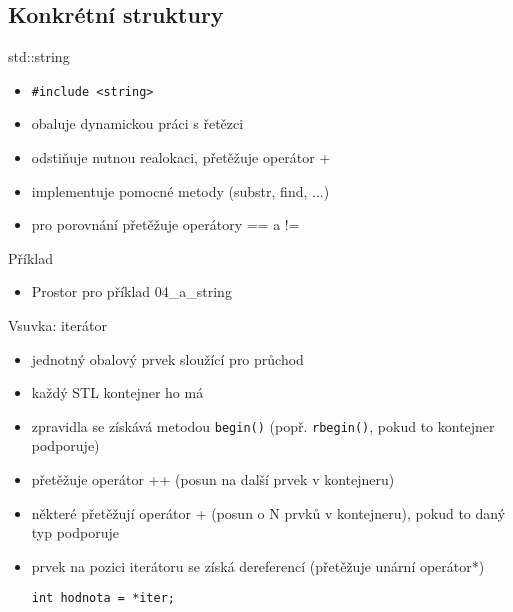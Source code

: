 \documentclass{beamer}
\begin{document}
\subsection{Konkrétní struktury}

\begin{xframe}{std::string}
	\begin{itemize}
		\item \texttt{\#include <string>}
		\item obaluje dynamickou práci s řetězci
		\item odstiňuje nutnou realokaci, přetěžuje operátor +
		\item implementuje pomocné metody (substr, find, ...)
		\item pro porovnání přetěžuje operátory == a !=
	\end{itemize}
\end{xframe}

\begin{xframe}{Příklad}
	\begin{itemize}
		\item Prostor pro příklad 04\_a\_string
	\end{itemize}
\end{xframe}

\begin{xframe}{Vsuvka: iterátor}
	\begin{itemize}
		\item jednotný obalový prvek sloužící pro průchod
		\item každý STL kontejner ho má
		\item zpravidla se získává metodou \texttt{begin()} (popř. \texttt{rbegin()}, pokud to kontejner podporuje)
		\item přetěžuje operátor ++ (posun na další prvek v kontejneru)
		\item některé přetěžují operátor + (posun o N prvků v kontejneru), pokud to daný typ podporuje
		\item prvek na pozici iterátoru se získá dereferencí (přetěžuje unární operátor*)
\begin{lstlisting}[basicstyle=\fontsize{8}{9}\selectfont\ttfamily]
int hodnota = *iter;
\end{lstlisting}
	\end{itemize}
\end{xframe}
\end{document}
